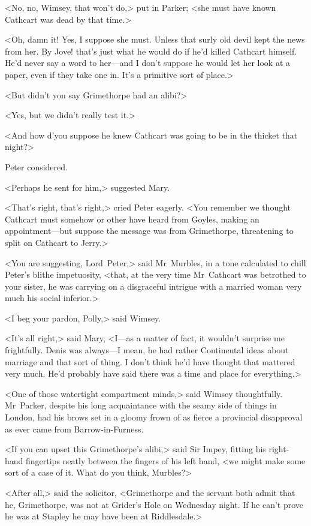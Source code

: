 <No, no, Wimsey, that won't do,> put in Parker; <she must have known Cathcart was dead by that time.>

<Oh, damn it! Yes, I suppose she must. Unless that surly old devil kept the news from her. By Jove! that's just what he would do if he'd killed Cathcart himself. He'd never say a word to her—and I don't suppose he would let her look at a paper, even if they take one in. It's a primitive sort of place.>

<But didn't you say Grimethorpe had an alibi?>

<Yes, but we didn't really test it.>

<And how d'you suppose he knew Cathcart was going to be in the thicket that night?>

Peter considered.

<Perhaps he sent for him,> suggested Mary.

<That's right, that's right,> cried Peter eagerly. <You remember we thought Cathcart must somehow or other have heard from Goyles, making an appointment—but suppose the message was from Grimethorpe, threatening to split on Cathcart to Jerry.>

<You are suggesting, Lord~Peter,> said Mr~Murbles, in a tone calculated to chill Peter's blithe impetuosity, <that, at the very time Mr~Cathcart was betrothed to your sister, he was carrying on a disgraceful intrigue with a married woman very much his social inferior.>

<I beg your pardon, Polly,> said Wimsey.

<It's all right,> said Mary, <I—as a matter of fact, it wouldn't surprise me frightfully. Denis was always—I mean, he had rather Continental ideas about marriage and that sort of thing. I don't think he'd have thought that mattered very much. He'd probably have said there was a time and place for everything.>

<One of those watertight compartment minds,> said Wimsey thoughtfully.  Mr~Parker, despite his long acquaintance with the seamy side of things in London, had his brows set in a gloomy frown of as fierce a provincial disapproval as ever came from Barrow-in-Furness.

<If you can upset this Grimethorpe's alibi,> said Sir Impey, fitting his right-hand fingertips neatly between the fingers of his left hand, <we might make some sort of a case of it. What do you think, Murbles?>

<After all,> said the solicitor, <Grimethorpe and the servant both admit that he, Grimethorpe, was not at Grider's Hole on Wednesday night. If he can't prove he was at Stapley he may have been at Riddlesdale.>

